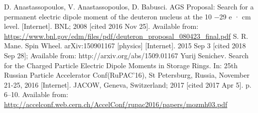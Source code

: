 \documentclass{article}
\begin{document}
\begin{thebibliography}{99}
  D. Anastassopoulos, V. Anastassopoulos, D. Babusci. AGS Proposal: Search for a permanent electric dipole moment of the deuteron nucleus at the 10 −29 e · cm level. [Internet]. BNL; 2008 [cited 2016 Nov 25]. Available from: \url{https://www.bnl.gov/edm/files/pdf/deuteron_proposal_080423_final.pdf}
S. R. Mane. Spin Wheel. arXiv:150901167 [physics] [Internet]. 2015 Sep 3 [cited 2018 Sep 28]; Available from: http://arxiv.org/abs/1509.01167
  Yurij Senichev. Search for the Charged Particle Electric Dipole Moments in Storage Rings. In: 25th Russian Particle Accelerator Conf(RuPAC’16), St Petersburg, Russia, November 21-25, 2016 [Internet]. JACOW, Geneva, Switzerland; 2017 [cited 2017 Apr 5]. p. 6–10. Available from: \url{http://accelconf.web.cern.ch/AccelConf/rupac2016/papers/mozmh03.pdf}

\end{thebibliography}
\end{document}
